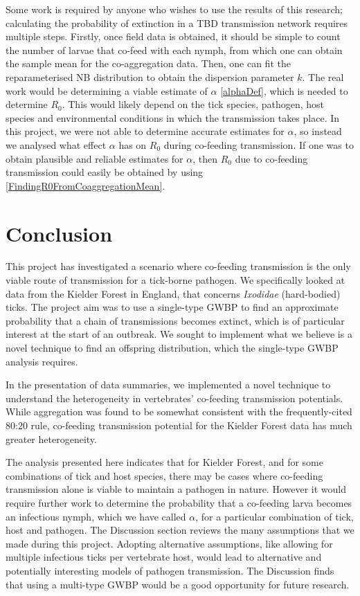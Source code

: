 \documentclass[hidelinks]{article}
\begin{document}
Some work is required by anyone who wishes to use the results of this research; calculating the probability of extinction in a TBD transmission network requires multiple steps. Firstly, once field data is obtained, it should be simple to count the number of larvae that co-feed with each nymph, from which one can obtain the sample mean for the co-aggregation data. Then, one can fit the reparameterised NB distribution to obtain the dispersion parameter $ k $. The real work would be determining a viable estimate of $ \alpha $ \eqref{alphaDef}, which is needed to determine $ R_0 $. This would likely depend on the tick species, pathogen, host species and environmental conditions in which the transmission takes place. In this project, we were not able to determine accurate estimates for $ \alpha $, so instead we analysed what effect $ \alpha $ has on $ R_0 $ during co-feeding transmission. If one was to obtain plausible and reliable estimates for $ \alpha $, then $ R_0 $ due to co-feeding transmission could easily be obtained by using \eqref{FindingR0FromCoaggregationMean}.

\newpage

\section{Conclusion}

This project has investigated a scenario where co-feeding transmission is the only viable route of transmission for a tick-borne pathogen. We specifically looked at data from the Kielder Forest in England, that concerns \textit{Ixodidae} (hard-bodied) ticks. The project aim was to use a single-type GWBP to find an approximate probability that a chain of transmissions becomes extinct, which is of particular interest at the start of an outbreak. We sought to implement what we believe is a novel technique to find an offspring distribution, which the single-type GWBP analysis requires.

In the presentation of data summaries, we implemented a novel technique to understand the heterogeneity in vertebrates' co-feeding transmission potentials. While aggregation was found to be somewhat consistent with the frequently-cited 80:20 rule, co-feeding transmission potential for the Kielder Forest data has much greater heterogeneity.

The analysis presented here indicates that for Kielder Forest, and for some combinations of tick and host species, there may be cases where co-feeding transmission alone is viable to maintain a pathogen in nature. However it would require further work to determine the probability that a co-feeding larva becomes an infectious nymph, which we have called $ \alpha $, for a particular combination of tick, host and pathogen. The Discussion section reviews the many assumptions that we made during this project. Adopting alternative assumptions, like allowing for multiple infectious ticks per vertebrate host, would lead to alternative and potentially interesting models of pathogen transmission. The Discussion finds that using a multi-type GWBP would be a good opportunity for future research.
\end{document}
